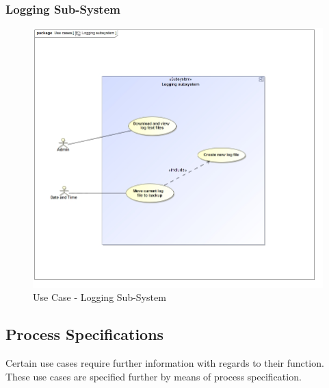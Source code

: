 \documentclass{article}
\begin{document}
			\cleardoublepage
			\subsubsection{Logging Sub-System}
			\begin{figure}[H]
				\includegraphics[width=\linewidth]{../Diagrams/Use Cases/Logging subsystem.jpg}
				\caption{Use Case - Logging Sub-System}
			\end{figure}
			
		\cleardoublepage	

		\subsection{Process Specifications}\label{subsec:processspecification}
		Certain use cases require further information with regards to their function.\\ These use cases are specified further by means of process specification.
\end{document}
